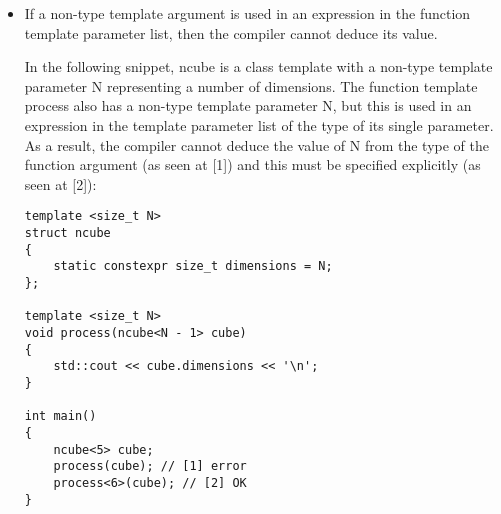 \begin{itemize}
\begin{itemize}
\item
The call to process2() at the point marked with [2] is correct because the non-type template parameter Size refers to the second dimension of an array.

\item 
On the other hand, the calls to process3() (at [3]) and process4() (at [4]) are both successful, since the function argument is either a reference or a pointer to a single-dimensional array:

\begin{lstlisting}[style=styleCXX]
template <size_t Size>
void process1(int a[Size])
{ std::cout << "process(int[Size])" << '\n'; };

template <size_t Size>
void process2(int a[5][Size])
{ std::cout << "process(int[5][Size])" << '\n'; };

template <size_t Size>
void process3(int(&a)[Size])
{ std::cout << "process(int[Size]&)" << '\n'; };

template <size_t Size>
void process4(int(*a)[Size])
{ std::cout << "process(int[Size]*)" << '\n'; };

int main()
{
	int arr1[10];
	int arr2[5][10];
	process1(arr1); // [1] error
	process2(arr2); // [2] OK
	process3(arr1); // [3] OK
	process4(&arr1); // [4] OK
}
\end{lstlisting}

\end{itemize}

\item
If a non-type template argument is used in an expression in the function template parameter list, then the compiler cannot deduce its value.

In the following snippet, ncube is a class template with a non-type template parameter N representing a number of dimensions. The function template process also has a non-type template parameter N, but this is used in an expression in the template parameter list of the type of its single parameter. As a result, the compiler cannot deduce the value of N from the type of the function argument (as seen at [1]) and this must be specified explicitly (as seen at [2]):

\begin{lstlisting}[style=styleCXX]
template <size_t N>
struct ncube
{
	static constexpr size_t dimensions = N;
};

template <size_t N>
void process(ncube<N - 1> cube)
{
	std::cout << cube.dimensions << '\n';
}

int main()
{
	ncube<5> cube;
	process(cube); // [1] error
	process<6>(cube); // [2] OK
}
\end{lstlisting}
\end{itemize}

